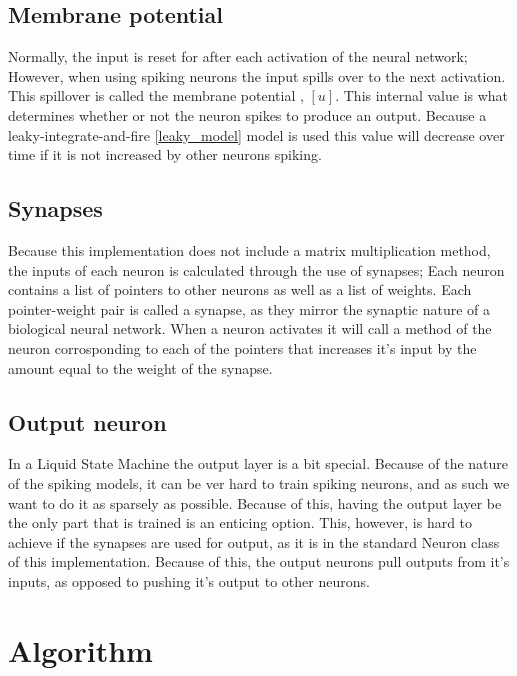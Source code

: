 \subsection{Membrane potential}

Normally, the input is reset for after each activation of the neural network; However, when using spiking neurons the input spills over to the next activation. This spillover is called the membrane potential \cite{leaky}, $[u]$. This internal value is what determines whether or not the neuron spikes to produce an output. Because a leaky-integrate-and-fire \ref{leaky_model} model is used  this value will decrease over time if it is not increased by other neurons spiking.

\subsection{Synapses}

Because this implementation does not include a matrix multiplication method, the inputs of each neuron is calculated through the use of synapses; Each neuron contains a list of pointers to other neurons as well as a list of weights. Each pointer-weight pair is called a synapse, as they mirror the synaptic nature of a biological neural network. When a neuron activates it will call a method of the neuron corrosponding to each of the pointers that increases it's input by the amount equal to the weight of the synapse.

\subsection{Output neuron}

In a Liquid State Machine the output layer is a bit special. Because of the nature of the spiking models, it can be ver hard to train spiking neurons, and as such we want to do it as sparsely as possible. Because of this, having the output layer be the only part that is trained is an enticing option. This, however, is hard to achieve if the synapses are used for output, as it is in the standard Neuron class of this implementation. Because of this, the output neurons pull outputs from it's inputs, as opposed to pushing it's output to other neurons.

\section{Algorithm}

